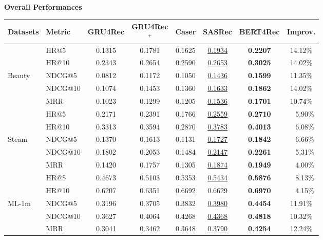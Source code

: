 \documentclass[25pt, a0paper, portrait, margin=0mm, innermargin=0pt, blockverticalspace=0mm, colspace=0mm, subcolspace=0mm]{tikzposter} %
\begin{document}
\begin{columns}
\begin{subcolumns}
{\begin{minipage}{0.9\linewidth}
        \vspace*{0.3cm}
        \normalsize
        \textbf{Overall Performances}
        \begin{center}
        \begin{adjustbox}{max width=0.95\textwidth}
        \begin{tabular}{l l c c c c c c}
        \toprule
        Datasets & Metric &  GRU4Rec & GRU4Rec$^+$ & Caser & SASRec & BERT4Rec & Improv.\\
        \midrule
         \multirow{5}{*}{Beauty} & HR@5  & 0.1315 & 0.1781 & 0.1625 & \underline{0.1934} & \textbf{0.2207} & 14.12\%\\
         & HR@10 & 0.2343 & 0.2654 & 0.2590 & \underline{0.2653} & \textbf{0.3025} & 14.02\%\\
         & NDCG@5 & 0.0812 & 0.1172 & 0.1050 & \underline{0.1436} & \textbf{0.1599} & 11.35\%\\
         & NDCG@10  & 0.1074 & 0.1453 & 0.1360 & \underline{0.1633} & \textbf{0.1862} & 14.02\%\\
          & MRR & 0.1023 & 0.1299 & 0.1205 & \underline{0.1536} & \textbf{0.1701} & 10.74\%\\
         \midrule
         \multirow{5}{*}{Steam} & HR@5 & 0.2171 & 0.2391 & 0.1766 & \underline{0.2559} & \textbf{0.2710} & ~~5.90\%\\
         & HR@10  & 0.3313 & 0.3594 & 0.2870 & \underline{0.3783} & \textbf{0.4013} & ~~6.08\% \\
         & NDCG@5 & 0.1370 & 0.1613 & 0.1131 & \underline{0.1727} & \textbf{0.1842} & ~~6.66\% \\
         & NDCG@10 & 0.1802 & 0.2053 & 0.1484 & \underline{0.2147} & \textbf{0.2261} & ~~5.31\%\\
         & MRR & 0.1420 & 0.1757 & 0.1305 & \underline{0.1874} & \textbf{0.1949} & ~~4.00\%\\
         \midrule
         \multirow{5}{*}{ML-1m} & HR@5 & 0.4673 & 0.5103 & 0.5353 & \underline{0.5434} & \textbf{0.5876} & ~~8.13\%\\
         & HR@10 & 0.6207 & 0.6351 &  \underline{0.6692} & 0.6629 & \textbf{0.6970} & ~~4.15\%\\
         & NDCG@5 & 0.3196 & 0.3705 & 0.3832 & \underline{0.3980} & \textbf{0.4454} & 11.91\%\\
         & NDCG@10  & 0.3627 & 	0.4064 & 0.4268 & \underline{0.4368} & \textbf{0.4818} & 10.32\%\\
         & MRR & 0.3041 & 	0.3462 & 0.3648 & \underline{0.3790} & \textbf{0.4254} & 12.24\%\\

\end{tabular}
\end{adjustbox}
\end{center}
\end{minipage}}
\end{subcolumns}
\end{columns}
\end{document}
